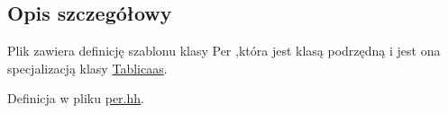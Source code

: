 \subsection{Opis szczegółowy}
Plik zawiera definicję szablonu klasy Per ,która jest klasą podrzędną i jest ona specjalizacją klasy \hyperlink{class_tablicaas}{Tablicaas}. 

Definicja w pliku \hyperlink{per_8hh_source}{per.\-hh}.

